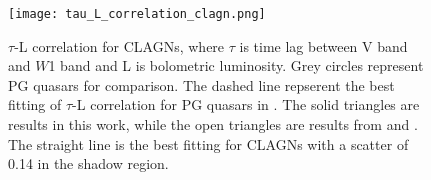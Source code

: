 \begin{figure}
\centering
	\texttt{[image: tau\_L\_correlation\_clagn.png]}
    \caption{$\tau$-L correlation for CLAGNs, where $\tau$ is time lag between V band and $W$1 band and L is bolometric luminosity. Grey circles represent PG quasars \citep{2019ApJ...886...33L} for comparison. The dashed line repserent the best fitting of $\tau$-L correlation for PG quasars in \citet{2019ApJ...886...33L}.  The solid triangles are results in this work, while the open triangles are results from \citet{2014ApJ...788..159K} and \citet{2019ApJ...886...33L}. The straight line is the best fitting for CLAGNs with a scatter of 0.14 in the shadow region.} 
    \label{fig:tau_L}
\end{figure}


